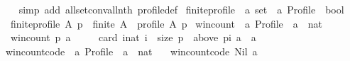 \begin{isabellebody}
%
\isadelimproof
\ \ %
\endisadelimproof
%
\isatagproof
{}\isamarkupfalse%
\ {\isacharparenleft}{\kern0pt}simp\ add{\isacharcolon}{\kern0pt}\ all{\isacharunderscore}{\kern0pt}set{\isacharunderscore}{\kern0pt}conv{\isacharunderscore}{\kern0pt}all{\isacharunderscore}{\kern0pt}nth\ profile{\isacharunderscore}{\kern0pt}def{\isacharparenright}{\kern0pt}%
\endisatagproof
{\isafoldproof}%
%
\isadelimproof
\isanewline
%
\endisadelimproof
\isanewline
{}\isamarkupfalse%
\ finite{\isacharunderscore}{\kern0pt}profile\ {\isacharcolon}{\kern0pt}{\isacharcolon}{\kern0pt}\ {\isachardoublequoteopen}{\isacharprime}{\kern0pt}a\ set\ {\isasymRightarrow}\ {\isacharprime}{\kern0pt}a\ Profile\ {\isasymRightarrow}\ bool{\isachardoublequoteclose}\ \isanewline
\ \ {\isachardoublequoteopen}finite{\isacharunderscore}{\kern0pt}profile\ A\ p\ {\isasymequiv}\ finite\ A\ {\isasymand}\ profile\ A\ p{\isachardoublequoteclose}%
\isadelimdocument
%
\endisadelimdocument
%
\isatagdocument
%
\isamarkuptrue%
%
\endisatagdocument
{\isafolddocument}%
%
\isadelimdocument
%
\endisadelimdocument
{}\isamarkupfalse%
\ win{\isacharunderscore}{\kern0pt}count\ {\isacharcolon}{\kern0pt}{\isacharcolon}{\kern0pt}\ {\isachardoublequoteopen}{\isacharprime}{\kern0pt}a\ Profile\ {\isasymRightarrow}\ {\isacharprime}{\kern0pt}a\ {\isasymRightarrow}\ nat{\isachardoublequoteclose}\ \isanewline
\ \ {\isachardoublequoteopen}win{\isacharunderscore}{\kern0pt}count\ p\ a\ {\isacharequal}{\kern0pt}\isanewline
\ \ \ \ card\ {\isacharbraceleft}{\kern0pt}i{\isacharcolon}{\kern0pt}{\isacharcolon}{\kern0pt}nat{\isachardot}{\kern0pt}\ i\ {\isacharless}{\kern0pt}\ size\ p\ {\isasymand}\ above\ {\isacharparenleft}{\kern0pt}p{\isacharbang}{\kern0pt}i{\isacharparenright}{\kern0pt}\ a\ {\isacharequal}{\kern0pt}\ {\isacharbraceleft}{\kern0pt}a{\isacharbraceright}{\kern0pt}{\isacharbraceright}{\kern0pt}{\isachardoublequoteclose}\isanewline
\isanewline
{}\isamarkupfalse%
\ win{\isacharunderscore}{\kern0pt}count{\isacharunderscore}{\kern0pt}code\ {\isacharcolon}{\kern0pt}{\isacharcolon}{\kern0pt}\ {\isachardoublequoteopen}{\isacharprime}{\kern0pt}a\ Profile\ {\isasymRightarrow}\ {\isacharprime}{\kern0pt}a\ {\isasymRightarrow}\ nat{\isachardoublequoteclose}\ \isanewline
\ \ {\isachardoublequoteopen}win{\isacharunderscore}{\kern0pt}count{\isacharunderscore}{\kern0pt}code\ Nil\ a\ {\isacharequal}{\kern0pt}\ {}{\isachardoublequoteclose}\ {\isacharbar}{\kern0pt}\isanewline

\end{isabellebody}
